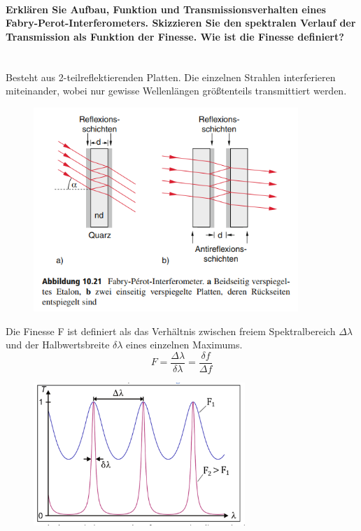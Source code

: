 \documentclass[a4paper, 11pt, ngerman, parskip=half-]{scrartcl}
\newcommand{\myparagraph}[1]{\paragraph{#1}\mbox{}\\}
\begin{document}
\begin{figure}[H]
\begin{minipage}[b]{0.5\textwidth}
        \end{minipage}
    \end{figure}

    \myparagraph{Erklären Sie Aufbau, Funktion und Transmissionsverhalten eines
        Fabry-Perot-Interferometers. Skizzieren Sie den spektralen Verlauf der Transmission als Funktion der
        Finesse. Wie ist die Finesse definiert?}
    Besteht aus 2-teilreflektierenden Platten. Die einzelnen Strahlen interferieren miteinander, wobei nur gewisse Wellenlängen größtenteils transmittiert werden.
    \begin{figure}[H]
        \centering
        \includegraphics[width=10cm]{image/18_Interferenz/Fabry-Perot_Interferometer.png}
    \end{figure}
    Die Finesse F ist definiert als das Verhältnis zwischen freiem Spektralbereich $\Delta\lambda$ und der Halbwertsbreite $\delta\lambda$ eines einzelnen Maximums.
    \begin{equation}
        F = \frac{\Delta \lambda}{\delta \lambda} = \frac{\delta f}{\Delta f}
    \end{equation}
    \begin{figure}[H]
        \centering
        \includegraphics[width=8cm]{image/18_Interferenz/Finesse.png}
    \end{figure}
\end{document}
